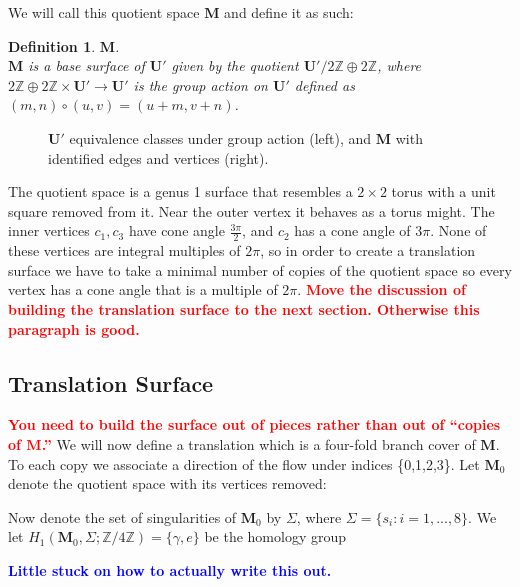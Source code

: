 \documentclass[]{article}
\newtheorem{Def}{Definition}[subsection]
\newcommand{\compav}[1]{\textbf{\textcolor{blue}{#1}}}
\newcommand{\compat}[1]{\textbf{\textcolor{red}{#1}}}
\begin{document}
We will call this quotient space $\mathbf{M}$ and define it as such:
\begin{Def}{$\mathbf{M}$.}\\
$\mathbf{M}$ is a base surface of $\mathbf{U}'$ given by the quotient $\mathbf{U}'/2\mathbb{Z}\oplus2\mathbb{Z}$, where $2\mathbb{Z}\oplus2\mathbb{Z}\times\mathbf{U}'\rightarrow\mathbf{U}'$ is the group action on $\mathbf{U}'$ defined as $(m,n)\circ(u,v)=(u+m,v+n)$.
\end{Def}

\begin{figure}[H]
\begin{center}
\hspace{0.2in}

\end{center}
\caption{$\mathbf{U}'$ equivalence classes under group action (left), and $\mathbf{M}$ with identified edges and vertices (right).}
\label{fig:quotient}
\end{figure}

The quotient space is a genus 1 surface that resembles a $2\times2$ torus with a unit square removed from it. Near the outer vertex it behaves as a torus might. The inner vertices $c_{1},c_{3}$ have cone angle $\frac{3\pi}{2}$, and $c_{2}$ has a cone angle of $3\pi$. None of these vertices are integral multiples of $2\pi$, so in order to create a translation surface we have to take a minimal number of copies of the quotient space so every vertex has a cone angle that is a multiple of $2\pi$. \compat{Move the discussion of building the translation surface to the next section. Otherwise this paragraph is good.}

\newpage
\subsection{Translation Surface}
\compat{You need to build the surface out of pieces rather than out of ``copies of $\mathbf{M}$.''} 
We will now define a translation which is a four-fold branch cover of $\mathbf{M}$. To each copy we associate a direction of the flow under indices \{0,1,2,3\}. Let $\mathbf{M}_{0} $ denote the quotient space with its vertices removed: 

\begin{center}

\end{center}

Now denote the set of singularities of $\mathbf{M}_{0}$ by $\Sigma$, where $\Sigma=\{s_{i}:i=1,...,8\}$. We let $ H_{1} (\mathbf{M}_{0}, \Sigma ; \mathbb{Z} / 4 \mathbb{Z}) =\{\gamma,e\}$ be the homology group 

\compav{Little stuck on how to actually write this out.}

\begin{figure}[H]
\begin{center}

\end{center}
\end{figure}

\begin{figure}[H]
\begin{center}

\end{center}
\end{figure}
\end{document}
